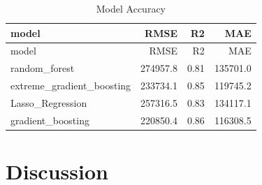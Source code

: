 \documentclass[11pt,]{article}
\begin{document}
\begin{longtable}[]{@{}lrrr@{}}
\caption{Model Accuracy}\tabularnewline
\toprule
model & RMSE & R2 & MAE\tabularnewline
\midrule
\endfirsthead
\toprule
model & RMSE & R2 & MAE\tabularnewline
\midrule
\endhead
random\_forest & 274957.8 & 0.81 & 135701.0\tabularnewline
extreme\_gradient\_boosting & 233734.1 & 0.85 & 119745.2\tabularnewline
Lasso\_Regression & 257316.5 & 0.83 & 134117.1\tabularnewline
gradient\_boosting & 220850.4 & 0.86 & 116308.5\tabularnewline
\bottomrule
\end{longtable}

\hypertarget{discussion}{%
\section{Discussion}\label{discussion}}





\newpage
\singlespacing 
\end{document}
